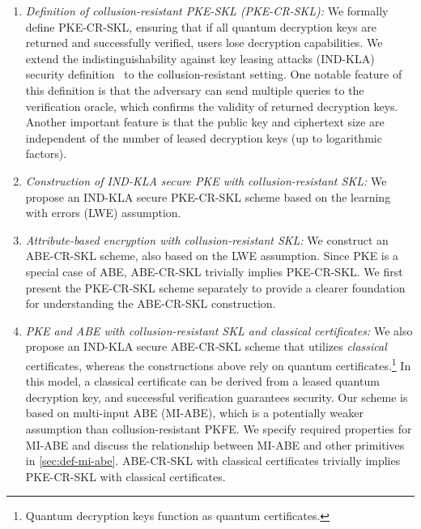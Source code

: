 \begin{enumerate}
    \item \emph{Definition of collusion-resistant PKE-SKL (PKE-CR-SKL):} We formally define PKE-CR-SKL, ensuring that if all quantum decryption keys are returned and successfully verified, users lose decryption capabilities. We extend the indistinguishability against key leasing attacks (IND-KLA) security definition~\cite{EC:AKNYY23} to the collusion-resistant setting. One notable feature of this definition is that the adversary can send multiple queries to the verification oracle, which confirms the validity of returned decryption keys. Another important feature is that the public key and ciphertext size are independent of the number of leased decryption keys (up to logarithmic factors).

    \item \emph{Construction of IND-KLA secure PKE with collusion-resistant SKL:} We propose an IND-KLA secure PKE-CR-SKL scheme based on the learning with errors (LWE) assumption.

     \item \emph{Attribute-based encryption with collusion-resistant SKL:} We construct an ABE-CR-SKL scheme, also based on the LWE assumption. Since PKE is a special case of ABE, ABE-CR-SKL trivially implies PKE-CR-SKL. We first present the PKE-CR-SKL scheme separately to provide a clearer foundation for understanding the ABE-CR-SKL construction.

     \item \emph{PKE and ABE with collusion-resistant SKL and
         classical certificates:} We also propose an IND-KLA secure
         ABE-CR-SKL scheme that utilizes \emph{classical} certificates, whereas the constructions above rely on quantum
         certificates.\footnote{Quantum decryption keys function as quantum certificates.} In this model, a classical certificate can be derived from a leased quantum decryption key, and successful verification guarantees security. Our scheme is based on multi-input ABE (MI-ABE), which is a potentially weaker assumption than collusion-resistant PKFE. We specify required properties for MI-ABE and discuss the relationship between MI-ABE and other primitives in \cref{sec:def-mi-abe}. ABE-CR-SKL with classical certificates trivially implies PKE-CR-SKL with classical certificates.
\end{enumerate}

